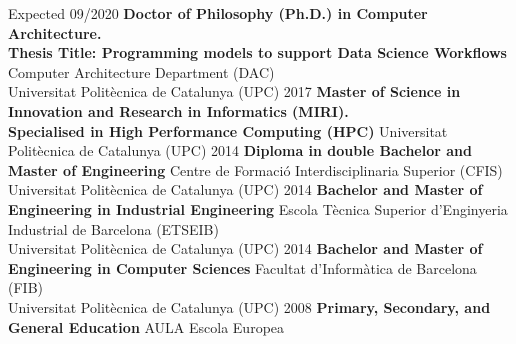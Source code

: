 %
%
%


\vspace{0.3em}

\begin{scholarship}
    \scholarshipentry
        {Expected 09/2020}
        {\textbf{Doctor of Philosophy (Ph.D.) in Computer Architecture.} \\ \textbf{Thesis Title: Programming models to support Data Science Workflows}}
        {Computer Architecture Department (DAC) \\ Universitat Politècnica de Catalunya (UPC)}
    \scholarshipentry
        {2017}
        {\textbf{Master of Science in Innovation and Research in Informatics (MIRI).} \\ \textbf{Specialised in High Performance Computing (HPC)}}
        {Universitat Politècnica de Catalunya (UPC)}
    \scholarshipentry
        {2014}
        {\textbf{Diploma in double Bachelor and Master of Engineering}}
        {Centre de Formació Interdisciplinaria Superior (CFIS) \\ Universitat Politècnica de Catalunya (UPC)}
    \scholarshipentry
        {2014}
        {\textbf{Bachelor and Master of Engineering in Industrial Engineering}}
        {Escola Tècnica Superior d'Enginyeria Industrial de Barcelona (ETSEIB) \\ Universitat Politècnica de Catalunya (UPC)}
    \scholarshipentry
        {2014}
        {\textbf{Bachelor and Master of Engineering in Computer Sciences}}
        {Facultat d'Informàtica de Barcelona (FIB) \\ Universitat Politècnica de Catalunya (UPC)}
    \scholarshipentry
        {2008}
        {\textbf{Primary, Secondary, and General Education}}
        {AULA Escola Europea}
\end{scholarship}

\vspace{-0.3em}